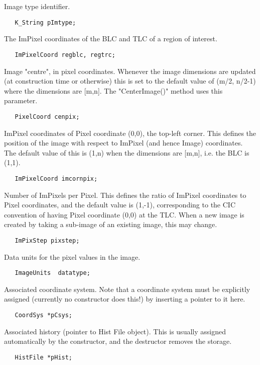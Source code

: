       Image type identifier.
\begin{verbatim}
   K_String pImtype;
\end{verbatim}

      The ImPixel coordinates of the BLC and TLC of a region of interest.
\begin{verbatim}
   ImPixelCoord regblc, regtrc;
\end{verbatim}

      Image "centre", in pixel coordinates.  Whenever the image dimensions are 
      updated (at construction time or otherwise) this is set to the
      default value of (m/2, n/2-1) where the dimensions are [m,n]. The 
      "CenterImage()" method uses this parameter.
\begin{verbatim}
   PixelCoord cenpix;
\end{verbatim}

      ImPixel coordinates of Pixel coordinate (0,0), the top-left corner. This 
      defines the position of the image with respect to ImPixel (and hence 
      Image) coordinates. The default value of this is (1,n) when the 
      dimensions are [m,n], i.e. the BLC is (1,1).
\begin{verbatim}
   ImPixelCoord imcornpix;
\end{verbatim}

      Number of ImPixels per Pixel. This defines the ratio of ImPixel    
      coordinates to Pixel coordinates, and the default value is (1,-1),
      corresponding to the CIC convention of having Pixel coordinate (0,0) 
      at the TLC. When a new image is created by taking a sub-image of an 
      existing image, this may change.
\begin{verbatim}
   ImPixStep pixstep;
\end{verbatim}

      Data units for the pixel values in the image.
\begin{verbatim}
   ImageUnits  datatype;
\end{verbatim}

      Associated coordinate system. Note that a coordinate system must be 
      explicitly assigned (currently no constructor does this!) by inserting
      a pointer to it here.
\begin{verbatim}
   CoordSys *pCsys;
\end{verbatim}

      Associated history (pointer to Hist File object). This is usually
      assigned automatically by the constructor, and the destructor
      removes the storage.
\begin{verbatim}
   HistFile *pHist;
\end{verbatim}


